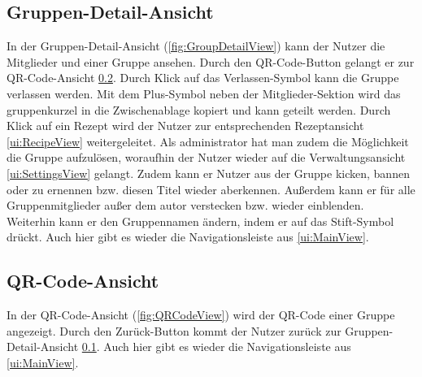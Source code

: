 \documentclass[parskip=full]{scrartcl}
\begin{document}
\subsection{Gruppen-Detail-Ansicht}
\label{ui:GroupDetailView}
In der Gruppen-Detail-Ansicht (\autoref{fig:GroupDetailView}) kann der Nutzer die Mitglieder und  einer Gruppe ansehen. Durch den QR-Code-Button gelangt er zur QR-Code-Ansicht \ref{ui:QRCodeView}. Durch Klick auf das Verlassen-Symbol kann die Gruppe verlassen werden. Mit dem Plus-Symbol neben der Mitglieder-Sektion wird das \gls{gruppenkurzel} in die Zwischenablage kopiert und kann geteilt werden. Durch Klick auf ein Rezept wird der Nutzer zur entsprechenden Rezeptansicht \ref{ui:RecipeView} weitergeleitet. Als \gls{administrator} hat man zudem die Möglichkeit die Gruppe aufzulösen, woraufhin der Nutzer wieder auf die Verwaltungsansicht \ref{ui:SettingsView} gelangt. Zudem kann er Nutzer aus der Gruppe \gls{kicken}, \gls{bannen} oder zu  ernennen bzw. diesen Titel wieder aberkennen. Außerdem kann er  für alle Gruppenmitglieder außer dem \gls{autor} verstecken bzw. wieder \gls{einblenden}. Weiterhin kann er den Gruppennamen ändern, indem er auf das Stift-Symbol drückt. Auch hier gibt es wieder die Navigationsleiste aus \ref{ui:MainView}.



\subsection{QR-Code-Ansicht}
\label{ui:QRCodeView}
In der QR-Code-Ansicht (\autoref{fig:QRCodeView}) wird der QR-Code einer Gruppe angezeigt. Durch den Zurück-Button kommt der Nutzer zurück zur Gruppen-Detail-Ansicht \ref{ui:GroupDetailView}. Auch hier gibt es wieder die Navigationsleiste aus \ref{ui:MainView}.
\newpage
\end{document}
